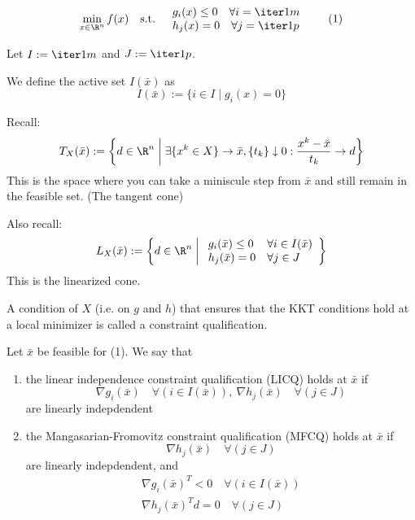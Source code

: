 \begin{equation*}
	\min_{x\in\R^n} f(x)\quad\text{s.t.}\quad\begin{array}{l}
		g_i(x)\leq0 \quad\forall i=\iter1m \\
		h_j(x)=0    \quad\forall j=\iter1p
	\end{array}
	\tag*{(1)}
\end{equation*}

Let $I:=\iter1m$ and $J:=\iter1p$.

We define the active set $I(\bar x)$ as
$$
	I(\bar x):=\{i\in I\mid g_i(x) = 0\}
$$

Recall:
$$
	T_X(\bar x):=\left\{
	d\in\R^n \;\middle\vert\; \exists \{x^k\in X\}\to\bar x,\{t_k\}\downarrow0:\frac{x^k-\bar x}{t_k}\to d
	\right\}
$$
This is the space where you can take a miniscule step from $\bar x$
and still remain in the feasible set. (The tangent cone)

Also recall:
$$
	L_X(\bar x):=\left\{
	d\in\R^n
	\;\middle\vert\;
	\begin{array}{l l}
		g_i(\bar x)\leq0 & \forall i\in I(\bar x) \\
		h_j(\bar x)=0    & \forall j\in J
	\end{array}
	\right\}
$$
This is the linearized cone.


A condition of $X$ (i.e. on $g$ and $h$) that ensures that the KKT
conditions hold at a local minimizer is called a constraint
qualification.


Let $\bar x$ be feasible for (1). We say that

\begin{enumerate}\renewcommand{\theenumi}{\alph{enumi}}
	\item the linear independence constraint qualification (LICQ) holds
	      at $\bar x$ if
	      $$
		      \nabla g_i(\bar x)\quad\forall(i\in I(\bar x)),\ \nabla h_j(\bar x)\quad\forall(j\in J)
	      $$
	      are linearly indepdendent
	\item the Mangasarian-Fromovitz constraint qualification (MFCQ)
	      holds at $\bar x$ if
	      $$
		      \nabla h_j(\bar x)\quad\forall(j\in J)
	      $$
	      are linearly indepdendent, and
	      \begin{gather*}
		      \nabla g_i(\bar x)^T < 0  \quad\forall(i\in I(\bar x))\\
		      \nabla h_j(\bar x)^Td = 0 \quad\forall(j\in J)
	      \end{gather*}
\end{enumerate}

